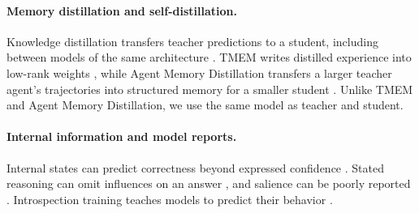\paragraph{Memory distillation and self-distillation.}
Knowledge distillation transfers teacher predictions to a student,
including between models of the same architecture
\citep{hinton2015distilling,furlanello2018bornagain}.
TMEM writes distilled experience into low-rank weights
\citep{tmem2026}, while Agent Memory Distillation transfers a larger
teacher agent's trajectories into structured memory for a smaller
student \citep{amd2026}. Unlike TMEM and Agent Memory Distillation,
we use the same model as teacher and student.

\paragraph{Internal information and model reports.}
Internal states can predict correctness beyond expressed confidence
\citep{kadavath2022know,azaria2023internal,orgad2024llmsknow}.
Stated reasoning can omit influences on an answer
\citep{turpin2023cot}, and salience can be poorly reported
\citep{trienes2025salience}. Introspection training teaches models to
predict their behavior \citep{binder2024introspection}.
